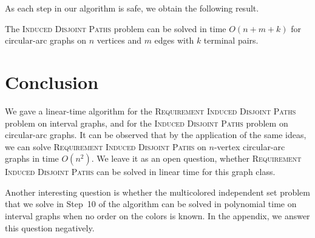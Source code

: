 \documentclass{llncs}
\newcommand{\problemIDP}{\textsc{Induced Disjoint Paths}}
\newcommand{\problemRIDP}{\textsc{Requirement Induced Disjoint Paths}}
\begin{document}
As each step in our algorithm is safe, we obtain the following result.
\begin{theorem}\label{t-circ}
The \problemIDP{} problem can be solved in time 
$O(n+m+k)$ for circular-arc graphs on $n$ vertices and $m$ edges with $k$ terminal pairs.
\end{theorem}


\section{Conclusion}\label{s-con}
We gave a linear-time algorithm for the \problemRIDP{} problem on interval graphs,
and for the \problemIDP{} problem on circular-arc graphs. It can be observed that by the application of the same ideas, we can solve 
\problemRIDP{} on $n$-vertex circular-arc graphs in time $O(n^2)$.  
We leave it as an open question, whether \problemRIDP{} can be solved in linear time for this graph class.

Another interesting question is whether the multicolored independent set problem that we solve in Step~10 of the algorithm can be solved in polynomial time on interval graphs when no order on the colors is known. In the appendix, we answer this question negatively.
\end{document}
